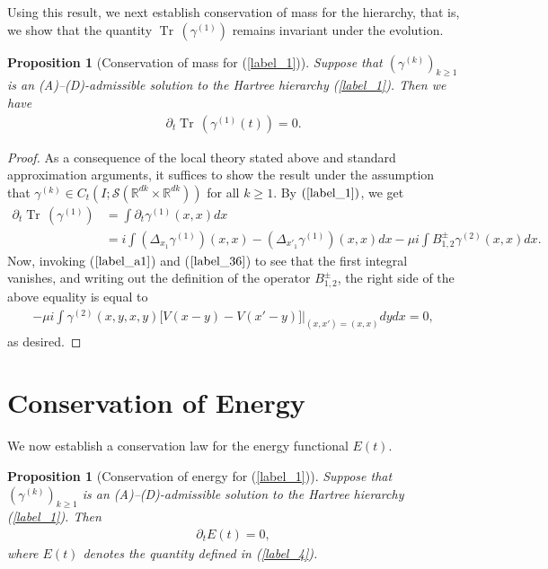 \documentclass[reqno]{amsart}
\numberwithin{equation}{section}
\newtheorem{proposition}[theorem]{Proposition}
\theoremstyle{remark}
\DeclareMathOperator{\Tr}{Tr\,}
\begin{document}
Using this result, we next establish conservation of mass for the hierarchy, that is, we show that the quantity $\Tr(\gamma^{(1)})$ remains invariant under the evolution.

\begin{proposition}[Conservation of mass for (\ref{label_1})]
\label{label_12}
Suppose that $(\gamma^{(k)})_{k\geq 1}$ is an (A)--(D)-admissible solution to the Hartree hierarchy (\ref{label_1}).  Then we have
\begin{align*}
\partial_t\Tr(\gamma^{(1)}(t))=0.
\end{align*}
\end{proposition}

\begin{proof}
As a consequence of the local theory stated above and standard approximation arguments, it suffices to show the result under the assumption that $\gamma^{(k)}\in C_t(I;\mathcal{S}(\mathbb{R}^{dk}\times\mathbb{R}^{dk}))$ for all $k\geq 1$.  By $(\ref{label_1})$, we get
\begin{align*}
\partial_t \Tr(\gamma^{(1)})&=\int \partial_t\gamma^{(1)}(x,x)dx\\
&=i\int (\Delta_{x_1}\gamma^{(1)})(x,x)-(\Delta_{x'_1}\gamma^{(1)})(x,x)dx-\mu i\int B_{1,2}^{\pm}\gamma^{(2)}(x,x)dx.
\end{align*}
Now, invoking ($\ref{label_a1}$) and ($\ref{label_36}$) to see that the first integral vanishes, and writing out the definition of the operator $B_{1,2}^\pm$, the right side of the above equality is equal to
\begin{align*}
-\mu i\int \gamma^{(2)}(x,y,x,y)\Big[V(x-y)-V(x'-y)\Big]\bigg|_{(x,x')=(x,x)}dydx=0,
\end{align*}
as desired.
\end{proof}

\section{Conservation of Energy}

We now establish a conservation law for the energy functional $E(t)$.

\begin{proposition}[Conservation of energy for (\ref{label_1})]
\label{label_13}
Suppose that $(\gamma^{(k)})_{k\geq 1}$ is an (A)--(D)-admissible solution to the Hartree hierarchy (\ref{label_1}).  Then 
\begin{align*}
\partial_t E(t)=0,
\end{align*}
where $E(t)$ denotes the quantity defined in (\ref{label_4}).
\end{proposition}
\end{document}

